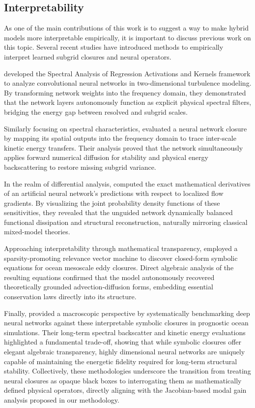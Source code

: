 \subsection{Interpretability}

As one of the main contributions of this work is to suggest a way to make hybrid models more interpretable empirically, it is important to discuss previous work on this topic. Several recent studies have introduced methods to empirically interpret learned subgrid closures and neural operators. 

\citet{subel2023explaining} developed the Spectral Analysis of Regression Activations and Kernels framework to analyze convolutional neural networks in two-dimensional turbulence modeling. By transforming network weights into the frequency domain, they demonstrated that the network layers autonomously function as explicit physical spectral filters, bridging the energy gap between resolved and subgrid scales.

Similarly focusing on spectral characteristics, \citet{guan2022stable} evaluated a neural network closure by mapping its spatial outputs into the frequency domain to trace inter-scale kinetic energy transfers. Their analysis proved that the network simultaneously applies forward numerical diffusion for stability and physical energy backscattering to restore missing subgrid variance.

In the realm of differential analysis, \cite{Portwood2021} computed the exact mathematical derivatives of an artificial neural network's predictions with respect to localized flow gradients. By visualizing the joint probability density functions of these sensitivities, they revealed that the unguided network dynamically balanced functional dissipation and structural reconstruction, naturally mirroring classical mixed-model theories.

Approaching interpretability through mathematical transparency, \citet{zanna2020data} employed a sparsity-promoting relevance vector machine to discover closed-form symbolic equations for ocean mesoscale eddy closures. Direct algebraic analysis of the resulting equations confirmed that the model autonomously recovered theoretically grounded advection-diffusion forms, embedding essential conservation laws directly into its structure.

Finally, \citet{ross2023benchmarking} provided a macroscopic perspective by systematically benchmarking deep neural networks against these interpretable symbolic closures in prognostic ocean simulations. Their long-term spectral backscatter and kinetic energy evaluations highlighted a fundamental trade-off, showing that while symbolic closures offer elegant algebraic transparency, highly dimensional neural networks are uniquely capable of maintaining the energetic fidelity required for long-term structural stability. Collectively, these methodologies underscore the transition from treating neural closures as opaque black boxes to interrogating them as mathematically defined physical operators, directly aligning with the Jacobian-based modal gain analysis proposed in our methodology.